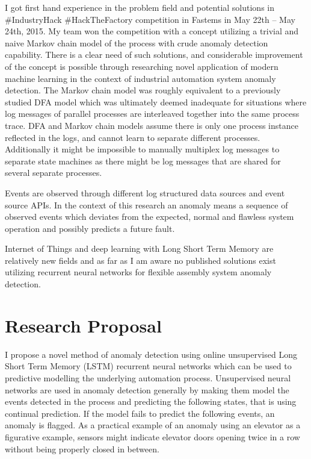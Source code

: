 \documentclass[a4paper,10pt]{article}
\begin{document}
I got first hand experience in the problem field and potential solutions in \#IndustryHack \#HackTheFactory competition in Fastems in May 22th – May 24th, 2015\cite{IndustryHack}.
My team won the competition with a concept utilizing a trivial and naive Markov chain model of the process with crude anomaly detection capability.
There is a clear need of such solutions, and considerable improvement of the concept is possible through researching novel application of modern machine learning in the context
of industrial automation system anomaly detection. The Markov chain model was roughly equivalent to a previously studied DFA model\cite{langer2011self} which was
ultimately deemed inadequate for
situations where log messages of parallel processes are interleaved together into the same process trace. DFA and Markov chain models assume there is only one process instance
reflected in the logs, and cannot learn to separate different processes. Additionally it might be impossible to manually multiplex log messages to separate state machines
as there might be log messages that are shared for several separate processes.

Events are observed through different log structured data sources and event source APIs. In the context of this research an anomaly means a sequence of observed events which
deviates from the expected, normal and flawless system operation and possibly predicts a future fault.

Internet of Things and deep learning with Long Short Term Memory are relatively new fields and as far as I am aware no published solutions exist utilizing
recurrent neural networks for flexible assembly system anomaly detection.

\section{Research Proposal}

I propose a novel method of anomaly detection using online unsupervised Long Short Term Memory (LSTM)\cite{LSTM} recurrent neural networks which can be used to predictive
modelling\cite{gers2000learning} the underlying automation process. Unsupervised neural networks are used in anomaly detection generally by making them model the events detected
in the process and predicting the following states, that is using continual prediction.
If the model fails to predict the following events, an anomaly is flagged.
As a practical example of an anomaly using an elevator as a figurative example, sensors might indicate elevator doors opening twice in a row without being properly closed in between.
\end{document}

